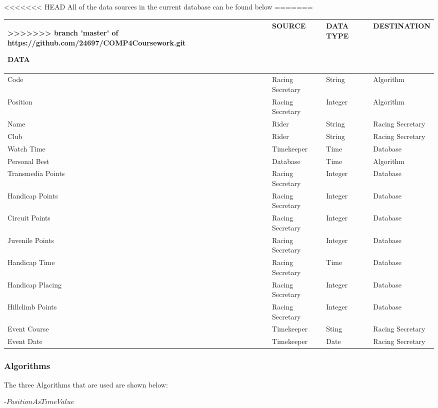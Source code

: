 <<<<<<< HEAD
All of the data sources in the current database can be found below
=======
\begin{tabular}{|l|l|l|l|}
>>>>>>> branch 'master' of https://github.com/24697/COMP4Coursework.git

\hline
DATA & SOURCE & DATA TYPE & DESTINATION \\ \hline
Code & Racing Secretary & String & Algorithm \\ \hline
Position & Racing Secretary & Integer & Algorithm \\ \hline
Name & Rider & String & Racing Secretary \\ \hline
Club & Rider & String & Racing Secretary \\ \hline
Watch Time & Timekeeper & Time & Database \\ \hline
Personal Best & Database & Time & Algorithm \\ \hline
Transmedia Points & Racing Secretary & Integer & Database \\ \hline
Handicap Points & Racing Secretary & Integer & Database \\ \hline
Circuit Points & Racing Secretary & Integer & Database \\ \hline
Juvenile Points & Racing Secretary & Integer & Database \\ \hline
Handicap Time & Racing Secretary & Time & Database \\ \hline
Handicap Placing & Racing Secretary & Integer & Database \\ \hline
Hillclimb Points & Racing Secretary & Integer & Database \\ \hline
Event Course & Timekeeper & Sting & Racing Secretary \\ \hline
Event Date & Timekeeper & Date & Racing Secretary \\ \hline

\end{tabular}

\subsubsection{Algorithms}
The three Algorithms that are used are shown below:

\begin{algorithm}[H]
\label{fig:Ride Time Algorithm}
	\caption{$Ride Time Algorithum$}
\begin{algorithmic}[1]
-{$PositionAsTimeValue$}
\end{algorithmic}
\end{algorithm}

